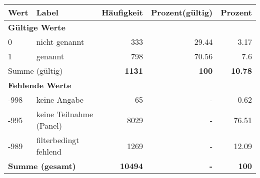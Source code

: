      \begin{longtable}{lXrrr}
     \toprule
     \textbf{Wert} & \textbf{Label} & \textbf{Häufigkeit} & \textbf{Prozent(gültig)} & \textbf{Prozent} \\
     \endhead
     \midrule
     \multicolumn{5}{l}{\textbf{Gültige Werte}}\\

     0 &
     \multicolumn{1}{X}{ nicht genannt   } &


       \num{333} &
       \num[round-mode=places,round-precision=2]{29,44} &
         \num[round-mode=places,round-precision=2]{3,17} \\

     1 &
     \multicolumn{1}{X}{ genannt   } &


       \num{798} &
       \num[round-mode=places,round-precision=2]{70,56} &
         \num[round-mode=places,round-precision=2]{7,6} \\
     \midrule
     \multicolumn{2}{l}{Summe (gültig)} &
       \textbf{\num{1131}} &
     \textbf{100} &
       \textbf{\num[round-mode=places,round-precision=2]{10,78}} \\
     \multicolumn{5}{l}{\textbf{Fehlende Werte}}\\
       -998 &
       keine Angabe &
         \num{65} &
        - &
         \num[round-mode=places,round-precision=2]{0,62} \\
       -995 &
       keine Teilnahme (Panel) &
         \num{8029} &
        - &
         \num[round-mode=places,round-precision=2]{76,51} \\
       -989 &
       filterbedingt fehlend &
         \num{1269} &
        - &
         \num[round-mode=places,round-precision=2]{12,09} \\
     \midrule
     \multicolumn{2}{l}{\textbf{Summe (gesamt)}} &
          \textbf{\num{10494}} &
        \textbf{-} &
        \textbf{100} \\
     \bottomrule
     \end{longtable}
     
